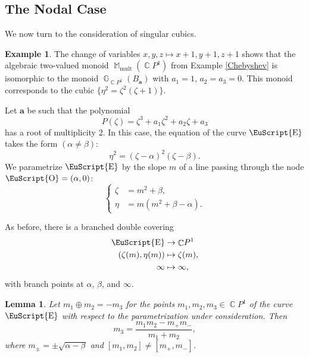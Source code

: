 \documentclass[14pt, dvipsnames]{extarticle}
\theoremstyle{plain}
\newtheorem{lemma}{Lemma}
\theoremstyle{definition}
\newtheorem{example}{\bf Example}
\theoremstyle{remark}
\DeclareMathOperator{\E}{\EuScript{E}}
\DeclareMathOperator{\G}{\mathbb{G}}
\DeclareMathOperator{\Cc}{\mathbb{C}}
\DeclareMathOperator{\Oo}{\EuScript{O}}
\DeclareMathOperator{\M}{\mathbb{M}}
\DeclareMathOperator{\mult}{\mathrm{mult}}
\begin{document}
\subsection{The Nodal Case}

We now turn to the consideration of singular cubics. 

\begin{example}
The change of variables $x,y,z\mapsto x+1, y+1, z+1$ shows that the algebraic two-valued monoid $\M_{\mult}(\Cc\!P^1)$ from Example \ref{Chebyshev} is isomorphic to the monoid $\G_{\Cc\!P^1}(B_{\boldsymbol{a}})$ with $a_1 = 1$, $a_2 = a_3 = 0$. This monoid corresponds to the cubic $\{\eta^2 = \zeta^2(\zeta + 1)\}$.
\end{example}

Let $\boldsymbol{a}$ be such that the polynomial
\begin{equation}
P(\zeta) = \zeta^3 + a_1\zeta^2 + a_2\zeta + a_3
\end{equation}
has a root of multiplicity $2$. In this case, the equation of the curve $\E$ takes the form $(\alpha\neq\beta)$:
\begin{equation}\label{nodal_curve}
\eta^2 = (\zeta - \alpha)^2(\zeta - \beta).
\end{equation}
We parametrize $\E$ by the slope $m$ of a line passing through the node $\Oo = (\alpha, 0)$:
$$\left\{\begin{aligned}
\zeta &= m^2 + \beta,\\
\eta &= m\left(m^2 + \beta - \alpha \right ).
\end{aligned}\right.$$

As before, there is a branched double covering
$$\begin{aligned}
\E &\to \Cc\!P^1\\
(\zeta(m), \eta(m))&\mapsto \zeta(m),\\
\infty&\mapsto\infty,
\end{aligned}$$
with branch points at $\alpha$, $\beta$, and $\infty$. 

\begin{lemma}\label{lemma_2}
Let $m_1\oplus m_2 = -m_3$ for the points $m_1, m_2, m_3\in \Cc\!P^1$ of the curve $\E$ with respect to the parametrization under consideration. Then
\begin{equation}\label{m3_node_case}
m_3 = \frac{m_1m_2 - m_{+}m_{-}}{m_1 + m_2},
\end{equation}
where $m_{\pm} = \pm\sqrt{\alpha - \beta}$ and $[m_1, m_2]\neq [m_{+}, m_{-}]$.
\end{lemma}
\end{document}
